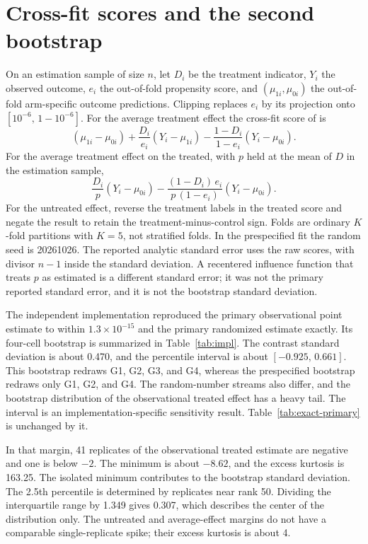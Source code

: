 \documentclass[twoside,11pt]{article}
\begin{document}
\section{Cross-fit scores and the second bootstrap}
\label{sec:scores}

On an estimation sample of size $n$, let $D_i$ be the treatment indicator, $Y_i$ the observed outcome, $e_i$ the out-of-fold propensity score, and $(\mu_{1i},\mu_{0i})$ the out-of-fold arm-specific outcome predictions. Clipping replaces $e_i$ by its projection onto $[10^{-6},\,1-10^{-6}]$. For the average treatment effect the cross-fit score of \citet{bang2005} is
\begin{equation}
(\mu_{1i}-\mu_{0i})
+
\frac{D_i}{e_i}(Y_i-\mu_{1i})
-
\frac{1-D_i}{1-e_i}(Y_i-\mu_{0i}).
\label{eq:ate-score}
\end{equation}
For the average treatment effect on the treated, with $p$ held at the mean of $D$ in the estimation sample,
\begin{equation}
\frac{D_i}{p}(Y_i-\mu_{0i})
-
\frac{(1-D_i)\,e_i}{p\,(1-e_i)}(Y_i-\mu_{0i}).
\label{eq:att-score}
\end{equation}
For the untreated effect, reverse the treatment labels in the treated score and negate the result to retain the treatment-minus-control sign. Folds are ordinary $K$-fold partitions with $K=5$, not stratified folds. In the prespecified fit the random seed is 20261026. The reported analytic standard error uses the raw scores, with divisor $n-1$ inside the standard deviation. A recentered influence function that treats $p$ as estimated is a different standard error; it was not the primary reported standard error, and it is not the bootstrap standard deviation.

The independent implementation reproduced the primary observational point estimate to within $1.3\times 10^{-15}$ and the primary randomized estimate exactly. Its four-cell bootstrap is summarized in Table~\ref{tab:impl}. The contrast standard deviation is about 0.470, and the percentile interval is about $[-0.925,\,0.661]$. This bootstrap redraws G1, G2, G3, and G4, whereas the prespecified bootstrap redraws only G1, G2, and G4. The random-number streams also differ, and the bootstrap distribution of the observational treated effect has a heavy tail. The interval is an implementation-specific sensitivity result. Table~\ref{tab:exact-primary} is unchanged by it.

In that margin, 41 replicates of the observational treated estimate are negative and one is below $-2$. The minimum is about $-8.62$, and the excess kurtosis is 163.25. The isolated minimum contributes to the bootstrap standard deviation. The 2.5th percentile is determined by replicates near rank 50. Dividing the interquartile range by 1.349 gives 0.307, which describes the center of the distribution only. The untreated and average-effect margins do not have a comparable single-replicate spike; their excess kurtosis is about 4.
\end{document}
